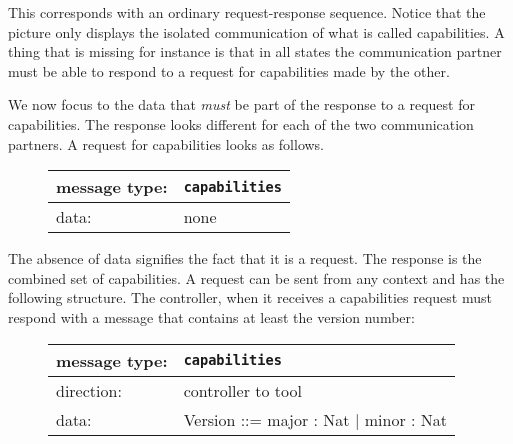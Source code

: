 \documentclass{article}
\newcommand{\msg}[1]{\texttt{#1}}
\begin{document}
   \noindent This corresponds with an ordinary request-response sequence.
   Notice that the picture only displays the isolated communication of what is
   called capabilities. A thing that is missing for instance is that in all
   states the communication partner must be able to respond to a request for
   capabilities made by the other.

   \noindent We now focus to the data that \emph{must} be part of the response to a
   request for capabilities. The response looks different for each of the two
   communication partners.
   A request for capabilities looks as follows.
   

   \begin{figure}[H]
    \begin{center}
     \begin{tabular}{|ll|}
      \hline
      message type:    & \msg{capabilities} \\
      \hline
      data:            & none \\
      \hline
     \end{tabular}
    \end{center}
   \end{figure}

   \noindent The absence of data signifies the fact that it is a request. The
   response is the combined set of capabilities. A request can be sent from any
   context and has the following structure. The controller, when it receives a
   capabilities request must respond with a message that contains at least the
   version number:

   \begin{figure}[H]
    \begin{center}
     \begin{tabular}{|ll|}
      \hline
       message type:   & \msg{capabilities} \\
      \hline
       direction:      & controller to tool \\
       data:           & Version ::= major : Nat $|$ minor : Nat \\
      \hline
     \end{tabular}
    \end{center}
   \end{figure}
\end{document}
